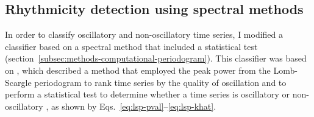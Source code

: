 \subsection{Rhythmicity detection using spectral methods}
\label{subsec:analysis-classification-spectral}

In order to classify oscillatory and non-oscillatory time series, I modified a classifier based on a spectral method that included a statistical test (section~\ref{subsec:methods-computational-periodogram}).
This classifier was based on \textcite{glynnDetectingPeriodicPatterns2006a}, which described a method that employed the peak power from the Lomb-Scargle periodogram \parencite{lombLeastsquaresFrequencyAnalysis1976} to rank time series by the quality of oscillation and to perform a statistical test to determine whether a time series is oscillatory or non-oscillatory \parencite{scargleStudiesAstronomicalTime1982}, as shown by Eqs.\ \ref{eq:lsp-pval}--\ref{eq:lsp-khat}.


